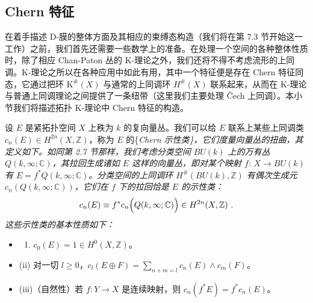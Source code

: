 \documentclass[11pt,a4paper]{ctexart}
\newcommand{\SrcRange}[2]{\marginpar{\raggedright\footnotesize 原文 p.#1}}
\begin{document}
\SrcRange{85}{85}
\subsection{Chern 特征}\label{chern-ux7279ux5f81}

在着手描述 D-膜的整体方面及其相应的束缚态构造（我们将在第 7.3 节开始这一工作）之前，我们首先还需要一些数学上的准备。在处理一个空间的各种整体性质时，除了相应 Chan-Paton 丛的 K-理论之外，我们还将不得不考虑流形的上同调。K-理论之所以在各种应用中如此有用，其中一个特征便是存在 Chern 特征同态，它通过把环 \({\mathrm K}^\#(X)\) 与通常的上同调环 \(H^\#(X)\) 联系起来，从而在 K-理论与普通上同调理论之间提供了一条纽带（这里我们主要处理 \v{C}ech 上同调）。本小节我们将描述拓扑 K-理论中 Chern 特征的构造。

设 \(E\) 是紧拓扑空间 \(X\) 上秩为 \(k\) 的复向量丛。我们可以给 \(E\) 联系上某些上同调类 \(c_n(E)\in H^{2n}(X,{\mathbb{Z}})\)，称为 \(E\) 的\{\it Chern 示性类\}，它们度量向量丛的扭曲，其定义如下。如同第 2.7 节那样，我们考虑分类空间 \(BU(k)\) 上的万有丛 \(Q(k,\infty;{\mathbb{C}})\)，其拉回生成诸如 \(E\) 这样的向量丛，即对某个映射 \(f:\, X\rightarrow BU(k)\) 有 \(E=f^*Q(k,\infty;{\mathbb{C}})\)。分类空间的上同调环 \(H^\#(BU(k),{\mathbb{Z}})\) 有偶次生成元 \(c_n(Q(k,\infty;{\mathbb{C}}))\)，它们在 \(f\) 下的拉回恰是 \(E\) 的示性类： \[c_n(E)\equiv f^*c_n\Bigl(Q(k,\infty;{\mathbb{C}})\Bigr)\in H^{2n}(X,{\mathbb{Z}})\ .\] 这些示性类的基本性质如下：

\begin{itemize}
\tightlist
\item
  \begin{enumerate}
  \def\labelenumi{(\roman{enumi})}
  \tightlist
  \item
    \(c_0(E)=1\in H^0(X,{\mathbb{Z}})\)。
  \end{enumerate}
\item
  (ii) 对一切 \(l\geq 0\)，\(c_l(E\oplus F)=\sum_{n+m=l}c_n(E)\wedge c_m(F)\)。
\item
  (iii)（自然性）若 \(f:Y\rightarrow X\) 是连续映射，则 \(c_n(f^*E)=f^*c_n(E)\)。
\end{itemize}
\end{document}
